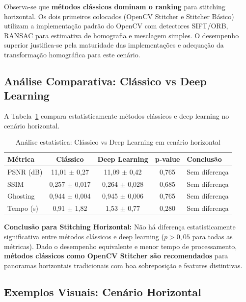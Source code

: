Observa-se que \textbf{métodos clássicos dominam o ranking} para stitching horizontal. Os dois primeiros colocados (OpenCV Stitcher e Stitcher Básico) utilizam a implementação padrão do OpenCV com detectores SIFT/ORB, RANSAC para estimativa de homografia e mesclagem simples. O desempenho superior justifica-se pela maturidade das implementações e adequação da transformação homográfica para este cenário.

\subsection{Análise Comparativa: Clássico vs Deep Learning}

A Tabela~\ref{tab:horizontal_classico_deep} compara estatisticamente métodos clássicos e deep learning no cenário horizontal.

\begin{table}[htb]
\centering
\caption{Análise estatística: Clássico vs Deep Learning em cenário horizontal}
\label{tab:horizontal_classico_deep}
\small
\begin{tabular}{lcccl}
\hline
\textbf{Métrica} & \textbf{Clássico} & \textbf{Deep Learning} & \textbf{p-value} & \textbf{Conclusão} \\ \hline
PSNR (dB) & 11,01 $\pm$ 0,27 & 11,09 $\pm$ 0,42 & 0,765 & Sem diferença \\
SSIM & 0,257 $\pm$ 0,017 & 0,264 $\pm$ 0,028 & 0,685 & Sem diferença \\
Ghosting & 0,944 $\pm$ 0,004 & 0,945 $\pm$ 0,006 & 0,765 & Sem diferença \\
Tempo (s) & 0,91 $\pm$ 1,82 & 1,53 $\pm$ 0,77 & 0,280 & Sem diferença \\
\hline
\end{tabular}
\end{table}

\textbf{Conclusão para Stitching Horizontal:} Não há diferença estatisticamente significativa entre métodos clássicos e deep learning ($p > 0,05$ para todas as métricas). Dado o desempenho equivalente e menor tempo de processamento, \textbf{métodos clássicos como OpenCV Stitcher são recomendados} para panoramas horizontais tradicionais com boa sobreposição e features distintivas.

\subsection{Exemplos Visuais: Cenário Horizontal}


